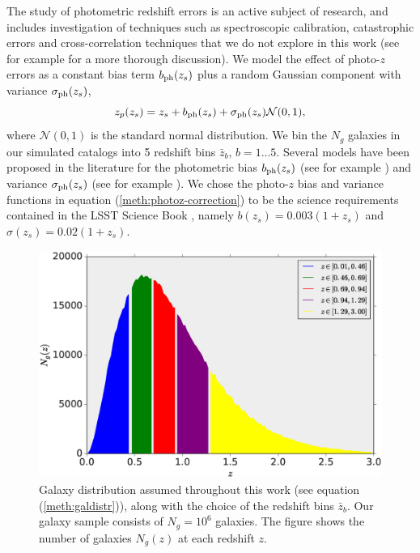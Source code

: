\documentclass[reprint,aps,prd,superscriptaddress,showkeys,showpacs]{revtex4-1}
\begin{document}
The study of photometric redshift errors is an active subject of research, and includes investigation of techniques such as spectroscopic calibration, catastrophic errors and cross-correlation techniques that we do not explore in this work (see for example \citep{HuTomo,LSSTSciBook} for a more thorough discussion). We model the effect of photo-$z$ errors as a constant bias term $b_{\rm ph}(z_s)$ plus a random Gaussian component with variance $\sigma_{\rm ph}(z_s)$,
\begin{equation}
\label{meth:photoz-correction}
z_p(z_s) = z_s + b_{\rm ph}(z_s) + \sigma_{\rm ph}(z_s)\mathcal{N}(0,1),   
\end{equation}
%
where $\mathcal{N}(0,1)$ is the standard normal distribution. We bin the $N_g$ galaxies in our simulated catalogs into 5 redshift bins $\bar{z}_b$, $b=1...5$. Several models have been proposed in the literature for the photometric bias $b_{\rm ph}(z_s)$ (see for example \citep{Huterer2006}) and variance $\sigma_{\rm ph}(z_s)$ (see for example \citep{LSSTSciBook}). We chose the photo-$z$ bias and variance functions in equation (\ref{meth:photoz-correction}) to be the science requirements contained in the LSST Science Book \citep{LSSTSciBook}, namely $b(z_s)=0.003(1+z_s)$ and $\sigma(z_s)=0.02(1+z_s)$. 

\begin{figure}
\includegraphics[scale=0.3]{Figures/galdistr.eps}
\caption{Galaxy distribution assumed throughout this work (see equation (\ref{meth:galdistr})), along with the choice of the redshift bins $\bar{z}_b$. Our galaxy sample consists of $N_g=10^6$ galaxies. The figure shows the number of galaxies $N_g(z)$ at each redshift $z$.}
\label{fig:galdistr}
\end{figure}
\end{document}
